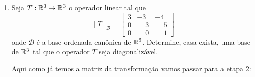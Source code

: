 \begin{exemplo}
\begin{enumerate}[label={\arabic*})]
\begin{solucao}
\begin{itemize}
                \item para $\lambda = i$ temos:
                \[
                    [T - iI_2]_\mathcal{B} = \begin{bmatrix} -i & -1\\\phantom{-}1 & -i\end{bmatrix}
                \]
                e assim $(x,y) \in \aut_T(i)$ se, e s\'o se,
                \[
                    \begin{bmatrix} -i & -1\\\phantom{-}1 & -i\end{bmatrix} \begin{bmatrix} x\\y\end{bmatrix}     = \begin{bmatrix} 0\\0\end{bmatrix}.
                \]
                Resolvendo esse sistema, obtemos $x = iy$. Logo
                \[
                    \aut_T(i) = \{(iy,y) \in \complex^2 \mid y \in \complex\} = [(i,1)].
                \]
                Assim, $\mathcal{B}_1 = \{(i,1)\}$ \'e uma base de $\aut_T(i)$ e então $\dim_\complex\aut_T(i) = 1$.
            \end{itemize}
            Agora o conjunto $\mathcal{D} = \mathcal{B}_1 \cup \mathcal{B}_2 = \{(-i,1); (i,1)\}$ \'e uma base de $\complex^2$ e nesta base temos
            \[
                [T]_\mathcal{B} = \begin{bmatrix} -i & 0\\\phantom{-}0 & i\end{bmatrix}.
            \]
        \end{solucao}
        \item Seja $T : \mathbb{R}^3 \to \mathbb{R}^3$ o operador linear tal que
        \[
            [T]_\mathcal{B} = \begin{bmatrix}
                                3 & -3 & -4\\
                                0 & \phantom{-}3 & \phantom{-}5\\
                                0 & \phantom{-}0 & \phantom{-}1
                            \end{bmatrix}
        \]
        onde $\mathcal{B}$ \'e a base ordenada canônica de $\mathbb{R}^3$. Determine, casa exista, uma base de $\mathbb{R}^3$ tal que o operador $T$ seja diagonaliz\'avel.
        \begin{solucao}
            Aqui como já temos a matriz da transforma\c{c}ão vamos passar para a etapa 2:

\end{solucao}
\end{enumerate}
\end{exemplo}
